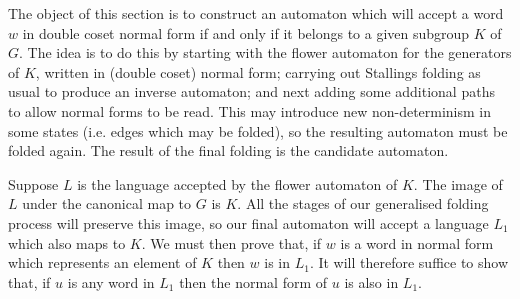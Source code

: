 \documentclass[a4paper,12pt]{article}
\newcommand{\G}{\Gamma }
\numberwithin{equation}{section}
\numberwithin{figure}{section}
\newcommand{\FF}{\ensuremath{\mathbb{F}}}
\begin{document}
The object of this section is to construct an automaton which will accept a word
$w$ in double coset normal form if and only if it belongs to a
given subgroup $K$ of $G$. The idea is to do this by starting with the
flower automaton for the generators of $K$, written in (double
coset) normal form; carrying out Stallings folding as usual to
produce an inverse automaton; and next
adding some additional paths to allow normal forms to be read.
This may introduce new non-determinism in some  states (i.e. edges
which may be folded), so the resulting automaton must be folded
again. The result of the final folding is the candidate automaton.

 Suppose $L$ is the
language accepted by the flower automaton of $K$. The image of $L$ under
the canonical map to $G$ is $K$. All the stages of our generalised folding
process will preserve this image, so our final automaton will accept a language
$L_1$ which also maps to $K$. We must then prove that, if $w$ is a word
in normal form which represents an element of $K$ then $w$ is in $L_1$. It will
therefore suffice to show that, if $u$ is any word in $L_1$ then the
normal form of $u$ is also in $L_1$.

\end{document}
